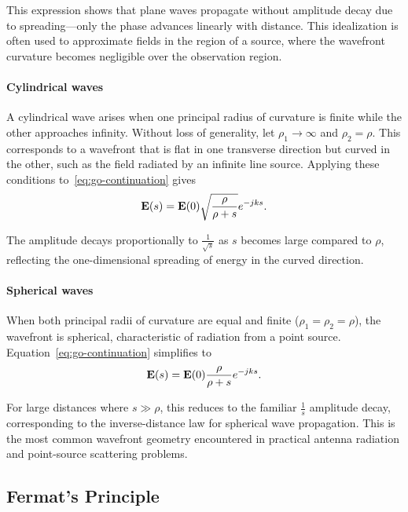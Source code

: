 This expression shows that plane waves propagate without amplitude decay due to spreading---only the phase advances linearly with distance. This idealization is often used to approximate fields in the  region of a source, where the wavefront curvature becomes negligible over the observation region.

\paragraph{Cylindrical waves}

A cylindrical wave arises when one principal radius of curvature is finite while the other approaches infinity. Without loss of generality, let $\rho_1 \to \infty$ and $\rho_2 = \rho$. This corresponds to a wavefront that is flat in one transverse direction but curved in the other, such as the field radiated by an infinite line source. Applying these conditions to~\eqref{eq:go-continuation} gives
\begin{equation}
  \mathbf{E}(s) = \mathbf{E}(0) \sqrt{\frac{\rho}{\rho + s}} e^{-jks}.
\end{equation}

The amplitude decays proportionally to $\tfrac{1}{\sqrt{s}}$ as $s$ becomes large compared to $\rho$, reflecting the one-dimensional spreading of energy in the curved direction.

\paragraph{Spherical waves}

When both principal radii of curvature are equal and finite ($\rho_1 = \rho_2 = \rho$), the wavefront is spherical, characteristic of radiation from a point source. Equation~\eqref{eq:go-continuation} simplifies to
\begin{equation}
  \mathbf{E}(s) = \mathbf{E}(0) \frac{\rho}{\rho + s} e^{-jks}.
\end{equation}

For large distances where $s \gg \rho$, this reduces to the familiar $\tfrac{1}{s}$ amplitude decay, corresponding to the inverse-distance law for spherical wave propagation. This is the most common wavefront geometry encountered in practical antenna radiation and point-source scattering problems.

\subsection{Fermat's Principle}

